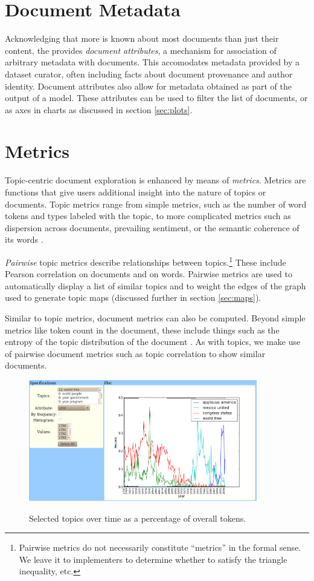 \documentclass[11pt]{article}
\begin{document}
\section{Document Metadata}
Acknowledging that more is known about most documents than just their content,
the \tool{} provides \textit{document attributes}, a mechanism for association
of arbitrary metadata with documents. This accomodates metadata
provided by a dataset curator, often including facts about document
provenance and author identity. Document attributes also allow for metadata
obtained as part of the output of a model. These attributes can be used to
filter the list of documents, or as axes in charts as discussed in section \ref{sec:plots}.

\section{Metrics}
Topic-centric document exploration is enhanced by means of \textit{metrics}.
Metrics are functions that give users additional insight into the nature of
topics or documents. Topic metrics range from
simple metrics, such as the number of word tokens and types labeled with the
topic, to more complicated metrics such as dispersion across documents,
prevailing sentiment, or the semantic coherence of its words \cite{Newman2010Coherence}.

\textit{Pairwise} topic metrics describe relationships between
topics.\footnote{Pairwise metrics do not necessarily constitute
``metrics'' in the formal sense. We leave it to implementers to determine
whether to satisfy the triangle inequality, etc.} These include Pearson correlation on documents and on words.
Pairwise metrics are used to automatically display a list of similar topics and to weight
the edges of the graph used to generate topic maps (discussed further in section
\ref{sec:maps}).

Similar to topic metrics, document metrics can also be computed.
Beyond simple metrics like token count in the document, these include
things such as the entropy of the topic distribution of the document \cite{Misra2008}. As
with topics, we make use of pairwise document metrics such as topic
correlation \cite{Blei2009} to show similar documents.

\begin{figure}[t]
 \centering
 \includegraphics[height=200px,keepaspectratio=true]{./topics_vs_years.png}
 \label{fig:chart}
 \caption{Selected topics over time as a percentage of overall tokens.}
\end{figure}
\end{document}
